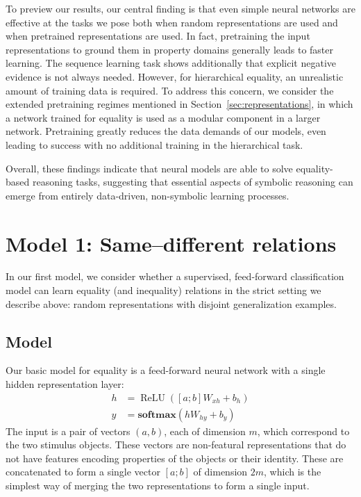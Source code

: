 \documentclass{article}
\newcommand{\secref}[1]{Section~\ref{#1}}
\newcommand{\update}[1]{{\color{darkblue}#1}}
\newcommand{\softmax}{\mathbf{softmax}}
\DeclareMathOperator{\ReLU}{ReLU}
\begin{document}
To preview our results, our central finding is that even simple neural networks are effective at the tasks we pose both when random representations are used and when pretrained representations are used. In fact, \update{ pretraining the input representations to ground them in property domains generally leads to faster learning}.  The sequence learning task shows additionally that explicit negative evidence is not always needed. However, for hierarchical equality, an unrealistic amount of training data is required. To address this concern, we consider the \update{extended pretraining regimes mentioned in \secref{sec:representations}, in which a network trained for equality is used as a modular component in a larger network.} Pretraining greatly reduces the data demands of our models, even leading to success with no additional training in the hierarchical task.

Overall, these findings indicate that neural models are able to solve equality-based reasoning tasks, suggesting that essential aspects of symbolic reasoning can emerge from entirely data-driven, non-symbolic learning processes.


\section{Model 1: Same--different relations}\label{sec:equality}

In our first model, we consider whether a supervised, feed-forward classification model can learn equality (and inequality) relations in the strict setting we describe above: random representations with disjoint generalization examples.


\subsection{Model}

Our basic model for equality is a feed-forward neural network with a single hidden representation layer:
%
\begin{align}
  h &= \ReLU([a;b]W_{xh} + b_{h}) \label{eq:x2h}\\
  y &= \softmax(hW_{hy} + b_{y}) \label{eq:h2y}
\end{align}
%
The input is a pair of vectors $(a, b)$, each of dimension $m$, which correspond to the two stimulus objects. These vectors are non-featural representations that do not have features encoding properties of the objects or their identity. These are concatenated to form a single vector $[a;b]$ of dimension $2m$, which is the simplest way of merging the two representations to form a single input.
\end{document}
